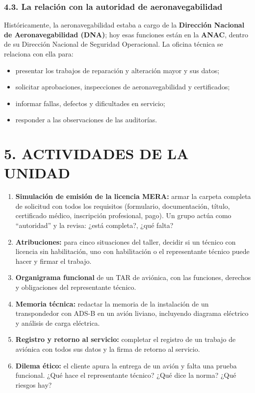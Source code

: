 \subsubsection*{4.3. La relación con la autoridad de aeronavegabilidad}
Históricamente, la aeronavegabilidad estaba a cargo de la \textbf{Dirección Nacional de
Aeronavegabilidad (DNA)}; hoy esas funciones están en la \textbf{ANAC}, dentro de su Dirección
Nacional de Seguridad Operacional. La oficina técnica se relaciona con ella para:
\begin{itemize}
  \item presentar los trabajos de reparación y alteración mayor y sus datos;
  \item solicitar aprobaciones, inspecciones de aeronavegabilidad y certificados;
  \item informar fallas, defectos y dificultades en servicio;
  \item responder a las observaciones de las auditorías.
\end{itemize}

\section*{5. ACTIVIDADES DE LA UNIDAD}
\begin{enumerate}
  \item \textbf{Simulación de emisión de la licencia MERA:} armar la carpeta completa de
        solicitud con todos los requisitos (formulario, documentación, título, certificado médico,
        inscripción profesional, pago). Un grupo actúa como ``autoridad'' y la revisa: ¿está
        completa?, ¿qué falta?
  \item \textbf{Atribuciones:} para cinco situaciones del taller, decidir si un técnico con
        licencia sin habilitación, uno con habilitación o el representante técnico puede hacer y
        firmar el trabajo.
  \item \textbf{Organigrama funcional} de un TAR de aviónica, con las funciones, derechos y
        obligaciones del representante técnico.
  \item \textbf{Memoria técnica:} redactar la memoria de la instalación de un transpondedor con
        ADS-B en un avión liviano, incluyendo diagrama eléctrico y análisis de carga eléctrica.
  \item \textbf{Registro y retorno al servicio:} completar el registro de un trabajo de aviónica
        con todos sus datos y la firma de retorno al servicio.
  \item \textbf{Dilema ético:} el cliente apura la entrega de un avión y falta una prueba
        funcional. ¿Qué hace el representante técnico? ¿Qué dice la norma? ¿Qué riesgos hay?
\end{enumerate}
